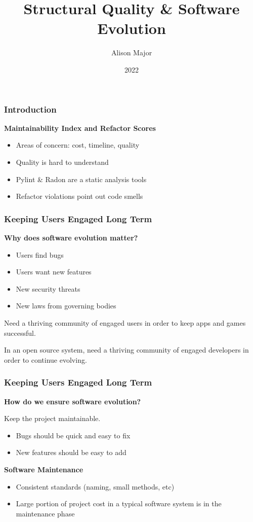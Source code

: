 \documentclass{beamer}
\title{Structural Quality \& Software Evolution}
\author{Alison Major}
\institute{Lewis University}
\date{2022}
\begin{document}
\frame{\titlepage}

\begin{frame}
  \frametitle{Introduction}
  \textbf{Maintainability Index and Refactor Scores}
  \begin{itemize}
    \item Areas of concern: cost, timeline, quality
    \item Quality is hard to understand
    \item Pylint \& Radon are a static analysis tools
    \item Refactor violations point out code smells
  \end{itemize}
\end{frame}


\begin{frame}
  \frametitle{Keeping Users Engaged Long Term}
  \textbf{Why does software evolution matter?}
  \begin{itemize}
    \item Users find bugs
    \item Users want new features
    \item New security threats
    \item New laws from governing bodies
  \end{itemize}
  
  \vspace{0.35cm}
  Need a thriving community of engaged users in order to keep apps and games successful.

  \vspace{0.35cm}
  In an open source system, need a thriving community of engaged developers in order to continue evolving.
\end{frame}

\begin{frame}
  \frametitle{Keeping Users Engaged Long Term}
  \textbf{How do we ensure software evolution?}

  \vspace{0.35cm}
  Keep the project maintainable.
  \begin{itemize}
    \item Bugs should be quick and easy to fix
    \item New features should be easy to add
  \end{itemize}

  \vspace{0.35cm}
  \textbf{Software Maintenance}
  \begin{itemize}
    \item Consistent standards (naming, small methods, etc)
    \item Large portion of project cost in a typical software system is in the maintenance phase
  \end{itemize}
\end{frame}
\end{document}
